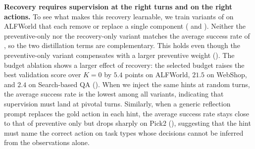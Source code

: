 \documentclass[10pt, logo, onecolumn, copyright]{nv}
\begin{document}
\begin{table}
\vspace{-6pt}
\centering
\small
\setlength{\tabcolsep}{3pt}
\renewcommand{\arraystretch}{1.15}
\vspace{3pt}
\caption{\textbf{Component ablations on ALFWorld with the Qwen3-1.7B student.} Each variant changes one component of \method{} (preventive only also raises $w_\text{prev}$). The average is over all six task types ().}
\label{tab:ablation_components}
\vspace{-9pt}
\end{table}

 \textbf{Recovery requires supervision at the right turns and on the right actions.}
To see what makes this recovery learnable, we train variants of \method{} on ALFWorld that each remove or replace a single component ( and ). Neither the preventive-only nor the recovery-only variant matches the average success rate of \method{}, so the two distillation terms are complementary. This holds even though the preventive-only variant compensates with a larger preventive weight (). The budget ablation shows a larger effect of recovery: the selected budget raises the best validation score over $K = 0$ by $5.4$ points on ALFWorld, $21.5$ on WebShop, and $2.4$ on Search-based QA (). When we inject the same hints at random turns, the average success rate is the lowest among all variants, indicating that supervision must land at pivotal turns. Similarly, when a generic reflection prompt replaces the gold action in each hint, the average success rate stays close to that of preventive only but drops sharply on Pick2 (), suggesting that the hint must name the correct action on task types whose decisions cannot be inferred from the observations alone.
\end{document}
